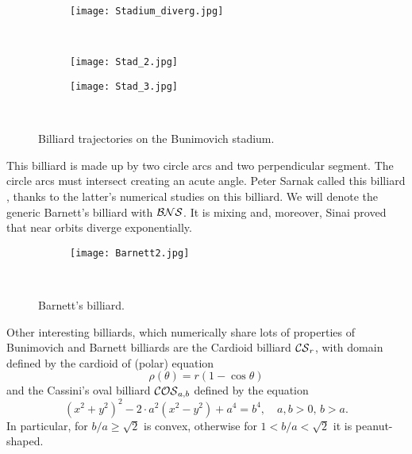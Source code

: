 \begin{figure}[H]
\centering
  \begin{subfigure}[b]{0.7\textwidth}
  \centering
    \texttt{[image: Stadium\_diverg.jpg]}
    \label{fig:bun1}
  \end{subfigure}
  \noindent\\
  \begin{subfigure}[b]{0.3\textwidth}
  \centering
    \texttt{[image: Stad\_2.jpg]}
    \label{fig:bun2}
  \end{subfigure}
  \begin{subfigure}[b]{0.3\textwidth}
  \centering
    \texttt{[image: Stad\_3.jpg]}
    \label{fig:bun3}
  \end{subfigure}
  \noindent\\
  \decoRule
  \caption{Billiard trajectories on the Bunimovich stadium.}
  \label{fig:bunimovich_orbits}
\end{figure}


\begin{nese}
This billiard is made up by two circle arcs and two perpendicular segment. The circle arcs must intersect creating an acute angle. Peter Sarnak called this billiard , thanks to the latter's numerical studies on this billiard. We will denote the generic Barnett's billiard with $\operatorname{\mathcal{BNS}}$. It is mixing and, moreover, Sinai proved that near orbits diverge exponentially.
\end{nese}


\begin{figure}[H]
\centering
  \begin{subfigure}[b]{0.7\textwidth}
  \centering
    \texttt{[image: Barnett2.jpg]}
    \label{fig:barn1}
  \end{subfigure}
  \noindent\\
  \decoRule
  \caption{Barnett's billiard.}
  \label{fig:barn_orbits}
\end{figure}

\begin{nese}
Other interesting billiards, which numerically share lots of properties of Bunimovich and Barnett billiards are the Cardioid billiard $\operatorname{\mathcal{CS}}_{r}$, with domain defined by the cardioid of (polar) equation
\[
\rho(\theta)=r(1-\cos\theta)
\]
and the Cassini's oval billiard $\operatorname{\mathcal{COS}}_{a,b}$ defined by the equation
\[
(x^{2}+y^{2})^{2}-2\cdot a^{2}(x^{2}-y^{2})+a^{4}=b^{4}, \quad a,b>0,\, b>a.
\]
In particular, for $b/a\geq\sqrt{2}$ is convex, otherwise for $1<b/a<\sqrt{2}$ it is peanut-shaped.
\end{nese}

